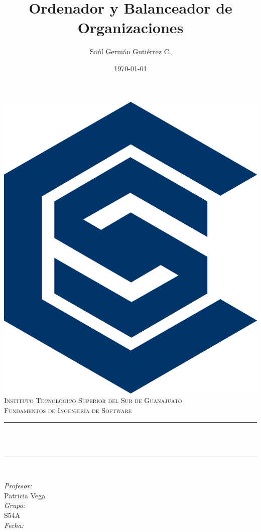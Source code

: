 \documentclass[12pt]{article}
\title{Ordenador y Balanceador de Organizaciones}
\author{Saúl Germán Gutiérrez C.}
\date{\today}
\makeatletter
\let\thetitle\@title
\let\thedate\@date
\makeatother
\begin{document}

\begin{titlepage}
  \centering
  \vspace*{0.5 cm}
  \includegraphics[scale = 0.6]{logo-sistemas}\\[1.0 cm]	%
  \textsc{\LARGE Instituto Tecnológico Superior del Sur de Guanajuato}\\[2.0 cm]	%
  \textsc{\Large Fundamentos de Ingeniería de Software}\\[0.5 cm]				%
  \rule{\linewidth}{0.2 mm} \\[0.4 cm]
  { \huge \bfseries \thetitle}\\
  \rule{\linewidth}{0.2 mm} \\[1.5 cm]
  
  \begin{minipage}{0.5\textwidth} %
    \begin{flushleft} \large
      \emph{Profesor:}\\
      Patricia Vega\\
      \emph{Grupo:} \\
      S54A \\
      \emph{Fecha:} \\
      \thedate     
    \end{flushleft}
  \end{minipage}~
  \begin{minipage}{0.4\textwidth}


\end{minipage}
\end{titlepage}
\end{document}
